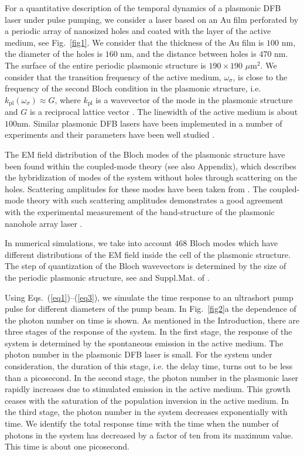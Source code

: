 \documentclass[aps,pra,amsmath,amssymb,onecolumn,superscriptaddress,showpacs,floatfix,]{revtex4-1}
\begin{document}
For a quantitative description of the temporal dynamics of a plasmonic DFB laser under pulse pumping, we consider a laser based on an Au film perforated by a periodic array of nanosized holes and coated with the layer of the active medium, see Fig.~\ref{fig1}. We consider that the thickness of the Au film is $100$ $\text{nm}$, the diameter of the holes is $160$ $\text{nm}$, and the distance between holes is $470$ $\text{nm}$. The surface of the entire periodic plasmonic structure is $190 \times 190$ $\mu \text{m}^2$. We consider that the transition frequency of the active medium, $\omega_{\sigma}$, is close to the frequency of the second Bloch condition in the plasmonic structure, i.e. $k_\text{pl}(\omega_{\sigma}) \approx G$, where $k_\text{pl}$ is a wavevector of the mode in the plasmonic structure and $G$ is a reciprocal lattice vector \cite{TennerJOpt,TennerACSPhot,nefedkin2018acsphot}. The linewidth of the active medium is about $100 \text{nm}$. Similar plasmonic DFB lasers have been implemented in a number of experiments \cite{BeijnumPRL,TennerJOpt,TennerACSPhot} and their parameters have been well studied \cite{BeijnumPRL,TennerJOpt,TennerACSPhot,nefedkin2018acsphot}.

The EM field distribution of the Bloch modes of the plasmonic structure have been found within the coupled-mode theory \cite{TennerJOpt,TennerACSPhot,nefedkin2018acsphot} (see also Appendix), which describes the hybridization of modes of the system without holes through scattering on the holes. Scattering amplitudes for these modes have been taken from \cite{TennerJOpt,TennerACSPhot}. The coupled-mode theory with such scattering amplitudes demonstrates a good agreement with the experimental measurement of the band-structure of the plasmonic nanohole array laser \cite{TennerJOpt,TennerACSPhot}.

In numerical simulations, we take into account $468$ Bloch modes which have different distributions of the EM field inside the cell of the plasmonic structure. The step of quantization of the Bloch wavevectors is determined by the size of the periodic plasmonic structure, see \cite{nefedkin2018acsphot} and Suppl.Mat. of \cite{nefedkin2018acsphot}.

Using Eqs.~(\ref{eq1})--(\ref{eq3}), we simulate the time response to an ultrashort pump pulse for different diameters of the pump beam.
In Fig.~\ref{fig2}a the dependence of the photon number on time is shown.
As mentioned in the Introduction, there are three stages of the response of the system.
In the first stage, the response of the system is determined by the spontaneous emission in the active medium.
The photon number in the plasmonic DFB laser is small.
For the system under consideration, the duration of this stage, i.e. the delay time, turns out to be less than a picosecond.
In the second stage, the photon number in the plasmonic laser rapidly increases due to stimulated emission in the active medium.
This growth ceases with the saturation of the population inversion in the active medium.
In the third stage, the photon number in the system decreases exponentially with time.
We identify the total response time with the time when the number of photons in the system has decreased by a factor of ten from its maximum value.
This time is about one picosecond.
  
\end{document}
